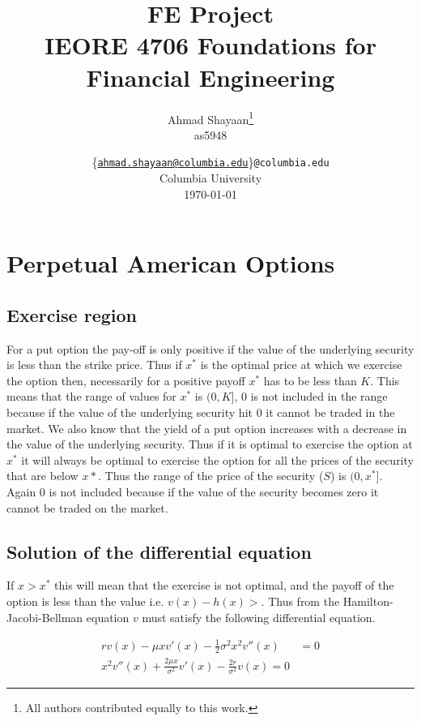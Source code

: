 \documentclass[12pt]{report}
\title{\Large{\textbf{FE Project}}\\\Large{IEORE 4706 Foundations for Financial Engineering}}
\author{
    Ahmad Shayaan\thanks{All authors contributed equally to this work.} \\as5948
    }
\date{
\{\href{mailto:ahmad.shayaan@columbia.edu}{\texttt{\small{ahmad.shayaan@columbia.edu}}}\}\texttt{\small{@columbia.edu}}\\
    Columbia University\\
    \today}
\begin{document}
\maketitle
\tableofcontents

\pagebreak

\chapter*{Perpetual American Options}

\section*{Exercise region}
For a put option the pay-off is only positive if the value of the underlying security is less than the strike price. Thus if $x^*$ is the optimal price at which we exercise the option then, necessarily for a positive payoff $x^*$ has to be less than $K$. This means that the range of values for $x^*$ is $(0,K]$, 0 is not included in the range because if the value of the underlying security hit 0 it cannot be traded in the market. We also know that the yield of a put option increases with a decrease in the value of the underlying security. Thus if it is optimal to exercise the option at $x^*$ it will always be optimal to exercise the option for all the prices of the security that are below $x*$. Thus the range of the price of the security ($S$) is $(0,x^*]$. Again 0 is not included because if the value of the security becomes zero it cannot be traded on the market.

\section*{Solution of the differential equation}
If $x > x^*$ this will mean that the exercise is not optimal, and the payoff of the option is less than the value i.e. $v(x) - h(x) > $. Thus from the Hamilton-Jacobi-Bellman equation $v$ must satisfy the following differential equation.

\begin{equation*}
	\begin{aligned}
		rv(x) -\mu xv'(x) - \frac{1}{2} \sigma^2 x^2 v''(x) &= 0 \\
		x^2v''(x) + \frac{2\mu x}{\sigma^2}v'(x) - \frac{2r}{\sigma^2} v(x) = 0
	\end{aligned}
\end{equation*}
\end{document}

